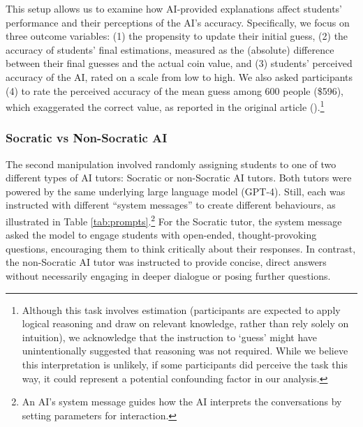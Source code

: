 \documentclass[
  11pt,
]{article}
\begin{document}
This setup allows us to examine how AI-provided explanations affect students' performance and their perceptions of the AI's accuracy. Specifically, we focus on three outcome variables: (1) the propensity to update their initial guess, (2) the accuracy of students' final estimations, measured as the (absolute) difference between their final guesses and the actual coin value, and (3) students' perceived accuracy of the AI, rated on a scale from low to high. We also asked participants (4) to rate the perceived accuracy of the mean guess among 600 people (\$596), which exaggerated the correct value, as reported in the original article ().\footnote{Although this task involves estimation (participants are expected to apply logical reasoning and draw on relevant knowledge, rather than rely solely on intuition), we acknowledge that the instruction to `guess' might have unintentionally suggested that reasoning was not required. While we believe this interpretation is unlikely, if some participants did perceive the task this way, it could represent a potential confounding factor in our analysis.}

\subsubsection{Socratic vs Non-Socratic AI}\label{socratic-vs-non-socratic-ai}

The second manipulation involved randomly assigning students to one of two different types of AI tutors: Socratic or non-Socratic AI tutors. Both tutors were powered by the same underlying large language model (GPT-4). Still, each was instructed with different ``system messages'' to create different behaviours, as illustrated in Table \ref{tab:prompts}.\footnote{An AI's system message guides how the AI interprets the conversations by setting parameters for interaction.} For the Socratic tutor, the system message asked the model to engage students with open-ended, thought-provoking questions, encouraging them to think critically about their responses. In contrast, the non-Socratic AI tutor was instructed to provide concise, direct answers without necessarily engaging in deeper dialogue or posing further questions.
\end{document}
